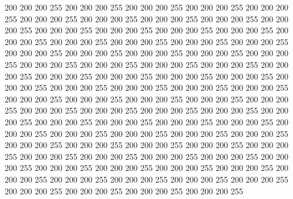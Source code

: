 200 200 200 255 200 200 200 255 200 200 200 255 200 200 200 255 200 200 200 255 200 200 200 255 200 200 200 255 200 200 200 255 200 200 200 255 200 200 200 255 200 200 200 255 200 200 200 255 200 200 200 255 200 200 200 255 200 200 200 255 200 200 200 255
200 200 200 255 200 200 200 255 200 200 200 255 200 200 200 255 200 200 200 255 200 200 200 255 200 200 200 255 200 200 200 255 200 200 200 255 200 200 200 255 200 200 200 255 200 200 200 255 200 200 200 255 200 200 200 255 200 200 200 255 200 200 200 255
200 200 200 255 200 200 200 255 200 200 200 255 200 200 200 255 200 200 200 255 200 200 200 255 200 200 200 255 200 200 200 255 200 200 200 255 200 200 200 255 200 200 200 255 200 200 200 255 200 200 200 255 200 200 200 255 200 200 200 255 200 200 200 255
200 200 200 255 200 200 200 255 200 200 200 255 200 200 200 255 200 200 200 255 200 200 200 255 200 200 200 255 200 200 200 255 200 200 200 255 200 200 200 255 200 200 200 255 200 200 200 255 200 200 200 255 200 200 200 255 200 200 200 255 200 200 200 255
200 200 200 255 200 200 200 255 200 200 200 255 200 200 200 255 200 200 200 255 200 200 200 255 200 200 200 255 200 200 200 255 200 200 200 255 200 200 200 255 200 200 200 255 200 200 200 255 200 200 200 255 200 200 200 255 200 200 200 255 200 200 200 255